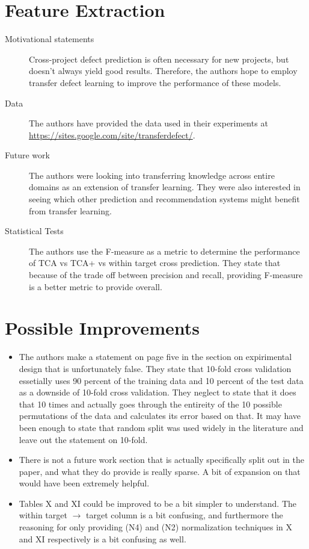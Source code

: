 \documentclass[english]{article}
\begin{document}
\section*{Feature Extraction}
\begin{description}
\item[{Motivational statements}] Cross-project defect prediction is often necessary for new projects, but doesn't always yield good results. Therefore, the authors hope to employ transfer defect learning to improve the performance of these models.
\item[{Data}] The authors have provided the data used in their experiments at\\
 \href{https://sites.google.com/site/transferdefect/}{https://sites.google.com/site/transferdefect/}.
\item[{Future work}] The authors were looking into transferring knowledge across entire domains as an extension of transfer learning. They were also interested in seeing which other prediction and recommendation systems might benefit from transfer learning.
\item[{Statistical Tests}] The authors use the F-measure as a metric to determine the performance of TCA vs TCA+ vs within target cross prediction.  They state that because of the trade off between precision and recall, providing F-measure is a better metric to provide overall.
\end{description}

\section*{Possible Improvements}
\begin{itemize}
\item The authors make a statement on page five in the section on expirimental design that is unfortunately false.  They state that 10-fold cross validation essetially uses 90 percent of the training data and 10 percent of the test data as a downside of 10-fold cross validation.  They neglect to state that it does that 10 times and actually goes through the entireity of the 10 possible permutations of the data and calculates its error based on that.  It may have been enough to state that random split was used widely in the literature and leave out the statement on 10-fold.

\item There is not a future work section that is actually specifically split out in the paper, and what they do provide is really sparse.  A bit of expansion on that would have been extremely helpful.

\item Tables X and XI could be improved to be a bit simpler to understand.  The within target $\rightarrow$ target column is a bit confusing, and furthermore the reasoning for only providing (N4) and (N2) normalization techniques in X and XI respectively is a bit confusing as well.

\end{itemize}
\end{document}
